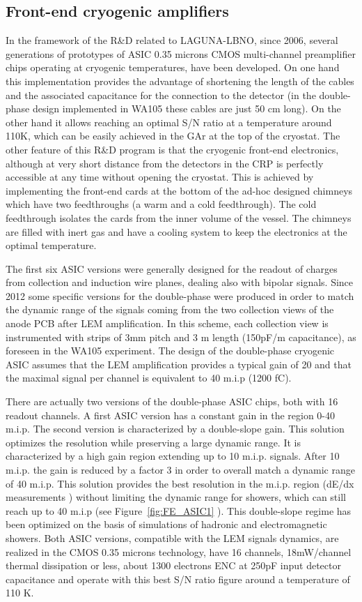 \subsection{Front-end cryogenic amplifiers}
In the framework of the R\&D related to LAGUNA-LBNO, since 2006, several generations of prototypes of ASIC 0.35 microns CMOS multi-channel preamplifier chips operating at cryogenic temperatures, have been developed. On one hand this implementation provides the advantage of shortening the length of the cables and the associated capacitance for the connection to the detector (in the double-phase design implemented in WA105 these cables are just 50 cm long). On the other hand it allows reaching an optimal S/N ratio at a temperature around 110K, which can be easily achieved in the GAr at the top of the cryostat. The other feature of this R\&D program is that the cryogenic front-end electronics, although at very short distance from the detectors in the CRP   is perfectly accessible at any time without opening the cryostat. This is achieved by implementing the front-end cards at the bottom of the ad-hoc designed chimneys which have two feedthroughs (a warm and a cold feedthrough). The cold feedthrough isolates the cards from the inner volume of the vessel. The chimneys are filled with inert gas and have a cooling system to keep the electronics at the optimal temperature.

The first six ASIC versions were generally designed for the readout of charges from collection and induction wire planes, dealing also with bipolar signals. Since 2012 some specific versions for the double-phase were produced in order to match the dynamic range of the signals coming from the two collection views of the anode PCB after LEM amplification. In this scheme, each collection view is instrumented with strips of 3mm pitch and 3 m length (150pF/m capacitance), as foreseen in the WA105 experiment. The design of the double-phase cryogenic ASIC  assumes that the LEM amplification provides a typical gain of 20 and that the maximal signal per channel is equivalent to 40 m.i.p (1200 fC).

There are actually two versions of the double-phase ASIC chips, both with 16 readout channels. A first ASIC version has a constant gain in the region 0-40 m.i.p. The second version is characterized by a double-slope gain. This solution optimizes the resolution while preserving a large dynamic range. It is characterized by a high gain region extending up to 10 m.i.p. signals. After 10 m.i.p. the gain is reduced by a factor 3 in order to overall match a dynamic range of 40 m.i.p. This solution provides the best resolution in the m.i.p. region (dE/dx measurements ) without limiting the dynamic range for showers, which can  still reach up to 40 m.i.p   (see  Figure~\ref{fig:FE_ASIC1} ). This double-slope regime has been optimized on the basis of simulations of hadronic and electromagnetic showers. Both ASIC versions, compatible with the LEM signals dynamics,  are realized in the CMOS 0.35 microns technology,  have 16 channels, 18mW/channel thermal dissipation or less,  about 1300 electrons ENC at 250pF input detector capacitance and operate with this best S/N ratio figure around  a temperature of 110 K.

